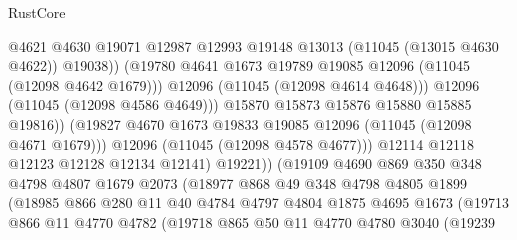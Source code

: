 \begin{lexlean}{RustCore}
\begin{coremodule}
                                    @4621
                                    @4630
                                    @19071
                                    @12987
                                    @12993
                                    @19148
                                    @13013
                                    (@11045 (@13015 @4630 @4622))
                                    @19038))
                                (@19780
                                  @4641
                                  @1673
                                  @19789
                                  @19085
                                  @12096
                                  (@11045 (@12098 @4642 @1679)))
                                @12096
                                (@11045 (@12098 @4614 @4648)))
                              @12096
                              (@11045 (@12098 @4586 @4649)))
                            @15870
                            @15873
                            @15876
                            @15880
                            @15885
                            @19816))
                        (@19827 @4670 @1673 @19833 @19085 @12096 (@11045 (@12098 @4671 @1679)))
                        @12096
                        (@11045 (@12098 @4578 @4677)))
                      @12114
                      @12118
                      @12123
                      @12128
                      @12134
                      @12141)
                    @19221))
                (@19109
                  @4690
                  @869
                  @350
                  @348
                  @4798
                  @4807
                  @1679
                  @2073
                  (@18977
                    @868
                    @49
                    @348
                    @4798
                    @4805
                    @1899
                    (@18985
                      @866
                      @280
                      @11
                      @40
                      @4784
                      @4797
                      @4804
                      @1875
                      @4695
                      @1673
                      (@19713
                        @866
                        @11
                        @4770
                        @4782
                        (@19718
                          @865
                          @50
                          @11
                          @4770
                          @4780
                          @3040
                          (@19239

\end{coremodule}
\end{lexlean}
